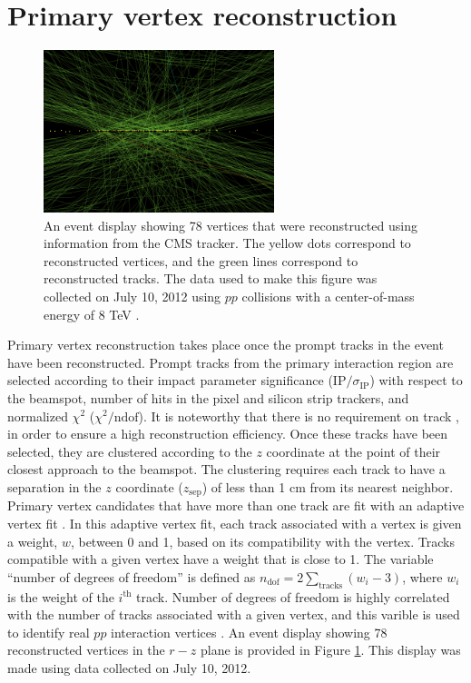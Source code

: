 \section{Primary vertex reconstruction}
\label{sec:reco-vtx}

\begin{figure}
  \centering
  \includegraphics[width=0.6\textwidth]{tex/reco/fig/reco-vtx.png}
  \caption{An event display showing 78 vertices that were reconstructed using information from the CMS tracker.
    The yellow dots correspond to reconstructed vertices, and the green lines correspond to reconstructed
    tracks. The data used to make this figure was collected on July 10, 2012 using $pp$ collisions with a 
    center-of-mass energy of 8 TeV \cite{vtx-pictures}.}
  \label{fig:reco-vtx}
\end{figure}


Primary vertex reconstruction takes place once the prompt tracks in the event 
have been reconstructed.  Prompt tracks from the primary
interaction region are selected according to their impact parameter significance
($\text{IP}/\sigma_{\text{IP}}$) with respect to the beamspot, number of hits
in the pixel and silicon strip trackers, and normalized $\chi^2$ ($\chi^2/\text{ndof}$).
It is noteworthy that there is no requirement on track \pt, in order to 
ensure a high reconstruction efficiency.
Once these tracks have been selected, they are clustered according to the $z$ coordinate
at the point of their closest approach to the beamspot.
The clustering requires each track to have a separation in the $z$ coordinate ($z_{\text{sep}}$) of less than 1 cm
from its nearest neighbor.  Primary vertex candidates that have more than one track 
are fit with an adaptive vertex fit \cite{vtx-3}.
In this adaptive vertex fit, each track associated with a vertex is given a weight, $w$, between 0 and 1,
based on its compatibility with the vertex.  Tracks compatible with a given vertex have a
weight that is close to 1.  The variable ``number of degrees of freedom'' is defined as 
$n_{\text{dof}} = 2 \sum_{\text{tracks}}\left(w_i -3\right)$, where $w_i$ is the weight of the $i^{\text{th}}$ track.
Number of degrees of freedom is highly correlated with the number of tracks associated with a given vertex,
and this varible is used to identify real $pp$ interaction vertices \cite{vtx-2}.
An event display showing 78 reconstructed vertices in the $r-z$ plane is provided in Figure \ref{fig:reco-vtx}.
This display was made using data collected on July 10, 2012.

